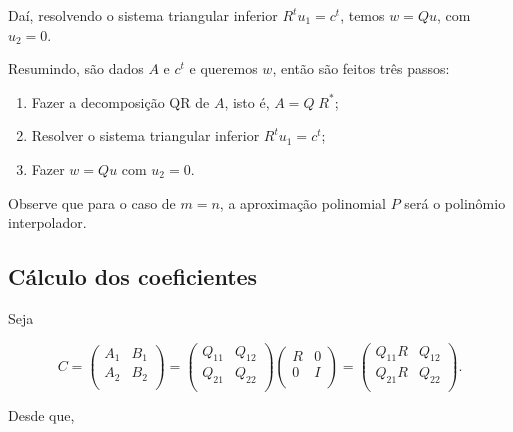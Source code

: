 \noindent Daí, resolvendo o sistema triangular inferior $R^t u_1 = c^t$, temos
$w = Q u$, com $u_2 = 0$.

Resumindo, são dados $A$ e $c^t$ e queremos $w$, então são feitos
três passos:

\begin{enumerate}
\item Fazer a decomposição QR de $A$, isto é, $A = Q \; R^*$;
\item Resolver o sistema triangular inferior $R^t u_1 = c^t$;
\item Fazer $w = Q u$ com $u_2 = 0$.
\end{enumerate}

Observe que para o caso de $m=n$, a aproximação polinomial $P$ será o polinômio
interpolador.

\subsection{Cálculo dos coeficientes}

Seja

$$
C = \left(
\begin{array}{ll}
A_1 & B_1\\
A_2 & B_2 \\
\end{array} \right) =
\left(
\begin{array}{ll}
Q_{11} & Q_{12} \\
Q_{21} & Q_{22} \\
\end{array}
\right)
\left(
\begin{array}{cc}
R & 0 \\
0 & I \\
\end{array}
\right) =
\left(
\begin{array}{ll}
Q_{11}  R & Q_{12} \\
Q_{21} R & Q_{22} \\
\end{array}
\right).
$$

\noindent Desde que,

